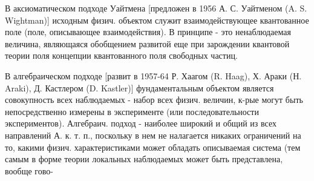 \documentclass[10pt]{article}
\begin{document}
В аксиоматическом подходе Уайтмена [предложен в 1956 А. С. Уайтменом (A. S. Wightman)] исходным физич. объектом служит взаимодействующее квантованное поле (поле, описывающее взаимодействия). В принципе - это ненаблюдаемая величина, являющаяся обобщением развитой еще при зарождении квантовой теории поля концепции квантованного поля свободных частиц.



В алгебраическом подходе [развит в 1957-64 Р. Хаагом (R. Haag), Х. Араки (Н. Araki), Д. Кастлером (D. Kastler)] фундаментальным объектом является совокупность всех наблюдаемых - набор всех физич. величин, к-рые могут быть непосредственно измерены в эксперименте (или последовательности экспериментов). Алгебраич. подход - наиболее широкий и общий из всех направлений А. к. т. п., поскольку в нем не налагается никаких ограничений на то, какими физич. характеристиками может обладать описываемая система (тем самым в форме теории локальных наблюдаемых может быть представлена, вообще гово-
\end{document}

